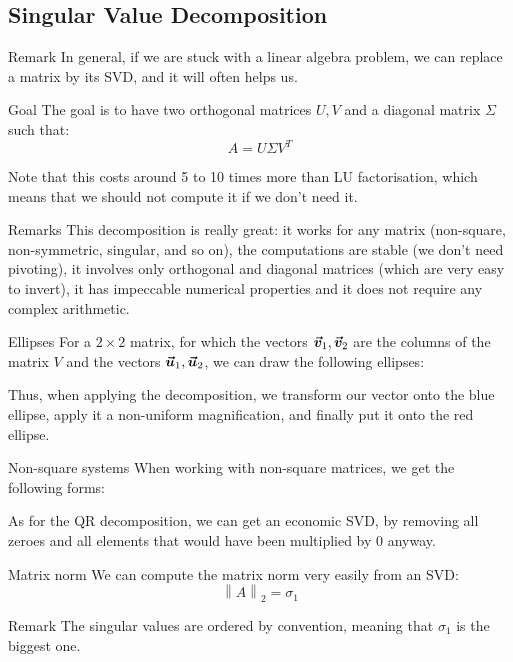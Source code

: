 \documentclass[a4paper]{article}
\begin{document}
\subsection{Singular Value Decomposition}
\begin{parag}{Remark}
    In general, if we are stuck with a linear algebra problem, we can replace a matrix by its SVD, and it will often helps us.
\end{parag}

\begin{parag}{Goal}
    The goal is to have two orthogonal matrices $U, V$ and a diagonal matrix $\Sigma$ such that: 
    \[A = U\Sigma V^T\]
    
    Note that this costs around 5 to 10 times more than LU factorisation, which means that we should not compute it if we don't need it.

    \begin{subparag}{Remarks}
        This decomposition is really great: it works for any matrix (non-square, non-symmetric, singular, and so on), the computations are stable (we don't need pivoting), it involves only orthogonal and diagonal matrices (which are very easy to invert), it has impeccable numerical properties and it does not require any complex arithmetic.
    \end{subparag}
    
    \begin{subparag}{Ellipses}
        For a $2\times2$ matrix, for which the vectors $\bm{\protect\vec{v}}_1, \bm{\protect\vec{v}}_2$ are the columns of the matrix $V$ and the vectors $\bm{\protect\vec{u}}_1, \bm{\protect\vec{u}}_2$, we can draw the following ellipses:

        Thus, when applying the decomposition, we transform our vector onto the blue ellipse, apply it a non-uniform magnification, and finally put it onto the red ellipse.
    \end{subparag}
\end{parag}

\begin{parag}{Non-square systems}
    When working with non-square matrices, we get the following forms:

    As for the QR decomposition, we can get an economic SVD, by removing all zeroes and all elements that would have been multiplied by 0 anyway.
\end{parag}

\begin{parag}{Matrix norm}
    We can compute the matrix norm very easily from an SVD: 
    \[\left\|A\right\|_2 = \sigma_1\]

    \begin{subparag}{Remark}
        The singular values are ordered by convention, meaning that $\sigma_1$ is the biggest one.
    \end{subparag}
    
\end{parag}
\end{document}
